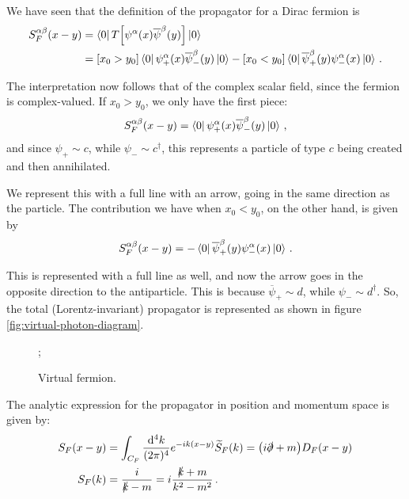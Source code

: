 \documentclass[main.tex]{subfiles}
\begin{document}
We have seen that the definition of the propagator for a Dirac fermion is 
%
\begin{subequations}
\begin{align}
S^{\alpha \beta }_{F}(x-y) 
&= \bra{0} T \qty[ \psi^{\alpha } (x) \overline{\psi}^{\beta }(y)] \ket{0}  \\
&= [x_0 > y_0 ]
\bra{0} \psi_{+}^{\alpha }(x) \overline{\psi}_{-}^{\beta } (y)\ket{0}
- [x_0 < y_0 ]
\bra{0} \overline{\psi}^{\beta }_{+}(y) \psi^{\alpha }_{-}(x) \ket{0}
\,.
\end{align}
\end{subequations}

The interpretation now follows that of the complex scalar field, since the fermion is complex-valued. 
If \(x_0 > y_0 \), we only have the first piece: 
%
\begin{align}
S^{\alpha \beta }_{F} (x-y) = \bra{0} \psi_{+}^{\alpha }(x) \overline{\psi}_{-}^{\beta } (y)\ket{0}
\,,
\end{align}
%
and since \(\psi_{+} \sim c\), while \(\psi_{-} \sim c ^\dag\), this represents a particle of type \(c\) being created and then annihilated.

We represent this with a full line with an arrow, going in the same direction as the particle.
The contribution we have when \(x_0 < y_0 \), on the other hand, is given by 
%
\begin{align}
S^{\alpha \beta }_{F}(x- y) = 
- \bra{0} \overline{\psi}^{\beta }_{+}(y) \psi^{\alpha }_{-}(x) \ket{0}
\,.
\end{align}

This is represented with a full line as well, and now the arrow goes in the opposite direction to the antiparticle. This is because \(\overline{\psi}_{+} \sim d\), while \(\psi_{-} \sim d ^\dag\). So, the total (Lorentz-invariant) propagator is represented as shown in figure \ref{fig:virtual-photon-diagram}.

\begin{figure}[ht]
\centering
{};
\caption{Virtual fermion.}
\label{fig:virtual-fermion-diagram}
\end{figure}

The analytic expression for the propagator in position and momentum space is given by: 
%
\begin{subequations}
\begin{align}
S_F (x-y) &= \int_{C_F} \frac{ \dd[4]{k}}{(2 \pi )^{4}} e^{-ik (x-y)}
\widetilde{S}_{F} (k) = \qty(i \slashed{\partial} + m )D_F(x-y) \\
S_F (k) &= \frac{i}{\slashed{k} - m} = i \frac{\slashed{k} + m }{k^2- m^2}
\,.
\end{align}
\end{subequations}
\end{document}
